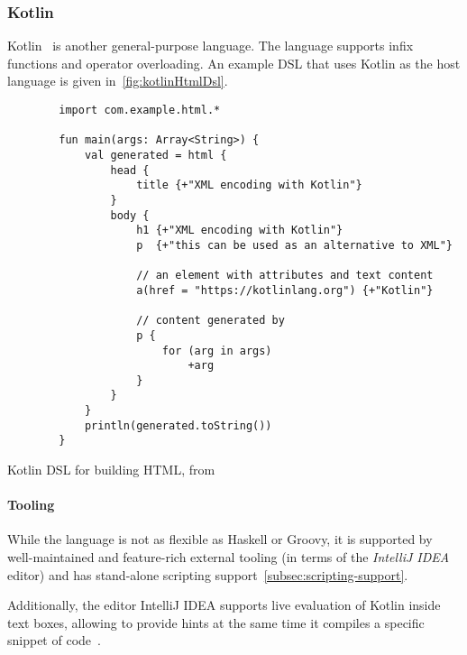 \subsubsection{Kotlin}\label{subsubsec:kotlinLang}

Kotlin~\cite{kotlinLang} is another general-purpose language.
The language supports infix functions and operator overloading.
An example DSL that uses Kotlin as the host language is given in~\autoref{fig:kotlinHtmlDsl}.

\begin{listing}[h]
    \centering
    \begin{minipage}{0.9\textwidth}
        \begin{verbatim}
        import com.example.html.*

        fun main(args: Array<String>) {
            val generated = html {
                head {
                    title {+"XML encoding with Kotlin"}
                }
                body {
                    h1 {+"XML encoding with Kotlin"}
                    p  {+"this can be used as an alternative to XML"}

                    // an element with attributes and text content
                    a(href = "https://kotlinlang.org") {+"Kotlin"}

                    // content generated by
                    p {
                        for (arg in args)
                            +arg
                    }
                }
            }
            println(generated.toString())
        }
        \end{verbatim}
    \end{minipage}
    \caption{Kotlin DSL for building HTML, from~\cite{kotlinTypeSafeBuilders}}
    \label{fig:kotlinHtmlDsl}
\end{listing}

\paragraph{Tooling} While the language is not as flexible as Haskell or Groovy, it is supported by well-maintained and feature-rich external tooling (in terms of the \textit{IntelliJ IDEA} editor) and has stand-alone scripting support~\autoref{subsec:scripting-support}.

Additionally, the editor IntelliJ IDEA supports live evaluation of Kotlin inside text boxes, allowing to provide hints at the same time it compiles a specific snippet of code~\cite{intelliJRepo}.

